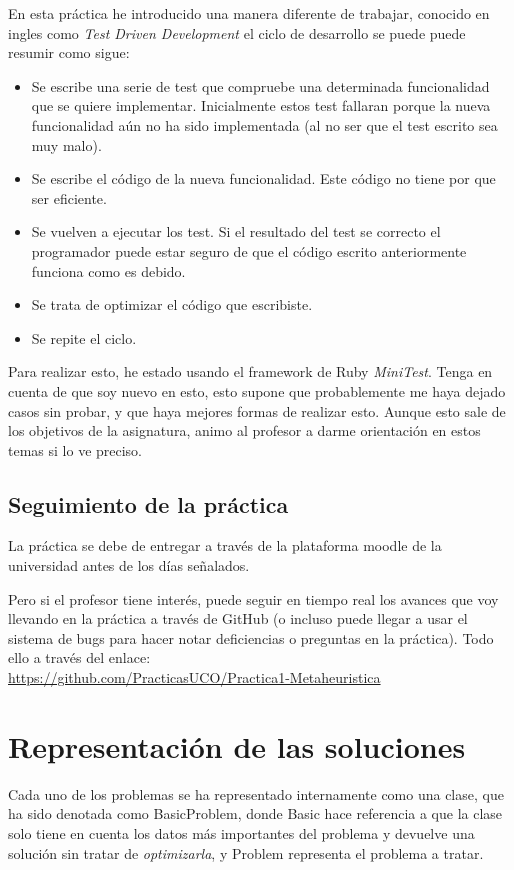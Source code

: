 \documentclass[12pt,a4paper,draft,openany]{article}
\begin{document}
En esta práctica he introducido una manera diferente de trabajar, conocido en ingles como \emph{Test Driven Development} el ciclo de desarrollo se puede puede resumir como sigue:
\begin{itemize}
\item Se escribe una serie de test que compruebe una determinada funcionalidad que se quiere implementar. Inicialmente estos test fallaran porque la nueva funcionalidad aún no ha sido implementada (al no ser que el test escrito sea muy malo).
\item Se escribe el código de la nueva funcionalidad. Este código no tiene por que ser eficiente.
\item Se vuelven a ejecutar los test. Si el resultado del test se correcto el programador puede estar seguro de que el código escrito anteriormente funciona como es debido.
\item Se trata de optimizar el código que escribiste.
\item Se repite el ciclo.
\end{itemize}

Para realizar esto, he estado usando el framework de Ruby \emph{MiniTest}. Tenga en cuenta de que soy nuevo en esto, esto supone que probablemente me haya dejado casos sin probar, y que haya mejores formas de realizar esto. Aunque esto sale de los objetivos de la asignatura, animo al profesor a darme orientación en estos temas si lo ve preciso.

\subsection{Seguimiento de la práctica}
La práctica se debe de entregar a través de la plataforma moodle de la universidad antes de los días señalados. 

Pero si el profesor tiene interés, puede seguir en tiempo real los avances que voy llevando en la práctica a través de GitHub (o incluso puede llegar a usar el sistema de bugs para hacer notar deficiencias o preguntas en la práctica).
Todo ello a través del enlace: \\ \url{https://github.com/PracticasUCO/Practica1-Metaheuristica}

\section{Representación de las soluciones}
Cada uno de los problemas se ha representado internamente como una clase, que ha sido denotada como BasicProblem, donde Basic hace referencia a que la clase solo tiene en cuenta los datos más importantes del problema y devuelve una solución sin tratar de \emph{optimizarla}, y Problem representa el problema a tratar.
\end{document}
